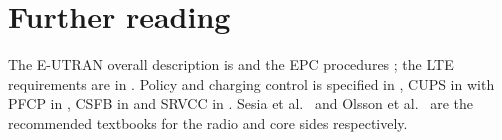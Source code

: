 \documentclass[11pt,a4paper]{article}
\begin{document}
\section{Further reading}
The E-UTRAN overall description is \cite{ts36300} and the EPC procedures \cite{ts23401}; the LTE
requirements are in \cite{tr25913}. Policy and charging control is specified in \cite{ts23203},
CUPS in \cite{ts23214} with PFCP in \cite{ts29244}, CSFB in \cite{ts23272} and SRVCC in
\cite{ts23216}. Sesia et al.\ \cite{sesia2011lte} and Olsson et al.\ \cite{olsson2013epc} are the
recommended textbooks for the radio and core sides respectively.

\printbibliography[heading=subbibliography,title={\ACNstrRefs}]
\end{document}
